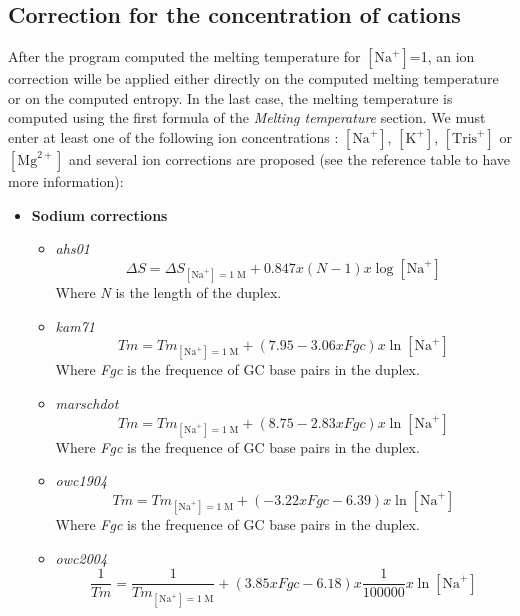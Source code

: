 \documentclass{article}
\begin{document}
\subsection{Correction for the concentration of cations}  

After the program computed the melting temperature for $[\mbox{Na}^+]$=1, an ion correction wille be applied
either directly on the computed melting temperature or on the computed entropy. In the last case, the melting
temperature is computed using the first formula of the \textit{Melting temperature} section.
We must enter at least one of the following ion concentrations : $[\mbox{Na}^+]$, $[\mbox{K}^+]$, $[\mbox{Tris}^+]$ or
$[\mbox{Mg}^{2+}]$ and several ion corrections are proposed  (see the reference table to have more information):
\begin{itemize}
\item \textbf{Sodium corrections}
 \begin{itemize}
 \item \textit{ahs01}
 \begin{displaymath}
  \Delta{}S=\Delta{}S_{[\mbox{Na}^+]=1\;\mathrm{M}}+0.847 x (N - 1) x \log [\mbox{Na}^+]   
 \end{displaymath}
 Where \emph{N} is the length of the duplex.
 \item \textit{kam71}
 \begin{displaymath}
  Tm=Tm_{[\mbox{Na}^+]=1\;\mathrm{M}}+(7.95 - 3.06 x Fgc) x \ln [\mbox{Na}^+]  
 \end{displaymath}
 Where \emph{Fgc} is the frequence of GC base pairs in the duplex.
 \item \textit{marschdot}
 \begin{displaymath}
  Tm=Tm_{[\mbox{Na}^+]=1\;\mathrm{M}}+ (8.75 - 2.83 x Fgc) x \ln [\mbox{Na}^+]  
 \end{displaymath}
 Where \emph{Fgc} is the frequence of GC base pairs in the duplex.
 \item \textit{owc1904}
 \begin{displaymath}
  Tm=Tm_{[\mbox{Na}^+]=1\;\mathrm{M}}+ (-3.22 x Fgc - 6.39) x \ln [\mbox{Na}^+]  
 \end{displaymath}
 Where \emph{Fgc} is the frequence of GC base pairs in the duplex.
 \item \textit{owc2004}
 \begin{displaymath}
 \frac{1}{Tm}=\frac{1}{Tm_{[\mbox{Na}^+]=1\;\mathrm{M}}}+ (3.85 x Fgc - 6.18) x \frac{1}{100000} x \ln [\mbox{Na}^+]  
 \end{displaymath}

\end{itemize}
\end{itemize}
\end{document}
